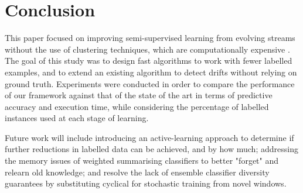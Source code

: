 \documentclass[runningheads]{llncs}
\begin{document}
\section{Conclusion\label{section:conclusion}}
This paper focused on improving semi-supervised learning from evolving streams without the use of clustering techniques, which are computationally expensive \cite{krempl2014open}. The goal of this study was to design fast algorithms to work with fewer labelled examples, and to extend an existing algorithm to detect drifts without relying on ground truth. Experiments were conducted in order to compare the performance of our framework against that of the state of the art in terms of predictive accuracy and execution time, while considering the percentage of labelled instances used at each stage of learning. 

Future work will include introducing an active-learning approach to determine if further reductions in labelled data can be achieved, and by how much; addressing the memory issues of weighted summarising classifiers to better "forget" and relearn old knowledge; and resolve the lack of ensemble classifier diversity guarantees by substituting cyclical for stochastic training from novel windows.

\printbibliography
\end{document}

